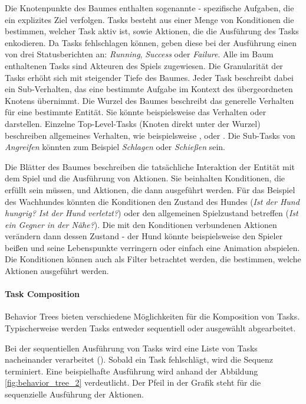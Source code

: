 Die Knotenpunkte des Baumes enthalten sogenannte  - spezifische Aufgaben, die ein explizites Ziel verfolgen. Tasks besteht aus einer Menge von Konditionen die bestimmen, welcher Task aktiv ist, sowie Aktionen, die die Ausführung des Tasks enkodieren. Da Tasks fehlschlagen können, geben diese bei der Ausführung einen von drei Statusberichten an: \textit{Running}, \textit{Success} oder \textit{Failure}. Alle im Baum enthaltenen Tasks sind Akteuren des Spiels zugewiesen. Die Granularität der Tasks erhöht sich mit steigender Tiefe des Baumes. Jeder Task beschreibt dabei ein Sub-Verhalten, das eine bestimmte Aufgabe im Kontext des übergeordneten Knotens übernimmt. Die Wurzel des Baumes beschreibt das generelle Verhalten für eine bestimmte Entität. Sie könnte beispielsweise das Verhalten  oder  darstellen. 
Einzelne Top-Level-Tasks (Knoten direkt unter der Wurzel) beschreiben allgemeines Verhalten, wie beispielsweise ,  oder . Die Sub-Tasks von \textit{Angreifen} könnten zum Beispiel \textit{Schlagen} oder \textit{Schießen} sein.

Die Blätter des Baumes beschreiben die tatsächliche Interaktion der Entität mit dem Spiel und die Ausführung von Aktionen. Sie beinhalten Konditionen, die erfüllt sein müssen, und Aktionen, die dann ausgeführt werden. Für das Beispiel des Wachhundes könnten die Konditionen den Zustand des Hundes (\textit{Ist der Hund hungrig? Ist der Hund verletzt?}) oder den allgemeinen Spielzustand betreffen (\textit{Ist ein Gegner in der Nähe?}). Die mit den Konditionen verbundenen Aktionen verändern dann dessen Zustand - der Hund könnte beispielsweise den Spieler beißen und seine Lebenspunkte verringern oder einfach eine Animation abspielen. Die Konditionen können auch als Filter betrachtet werden, die bestimmen, welche Aktionen ausgeführt werden\cite{cmsc_425}.


\paragraph{Task Composition}
Behavior Trees bieten verschiedene Möglichkeiten für die Komposition von Tasks. Typischerweise werden Tasks entweder sequentiell oder ausgewählt abgearbeitet.

Bei der sequentiellen Ausführung von Tasks wird eine Liste von Tasks nacheinander verarbeitet (). Sobald ein Task fehlschlägt, wird die Sequenz terminiert. Eine beispielhafte Ausführung wird anhand der Abbildung \ref{fig:behavior_tree_2} verdeutlicht. Der Pfeil in der Grafik steht für die sequenzielle Ausführung der Aktionen.


